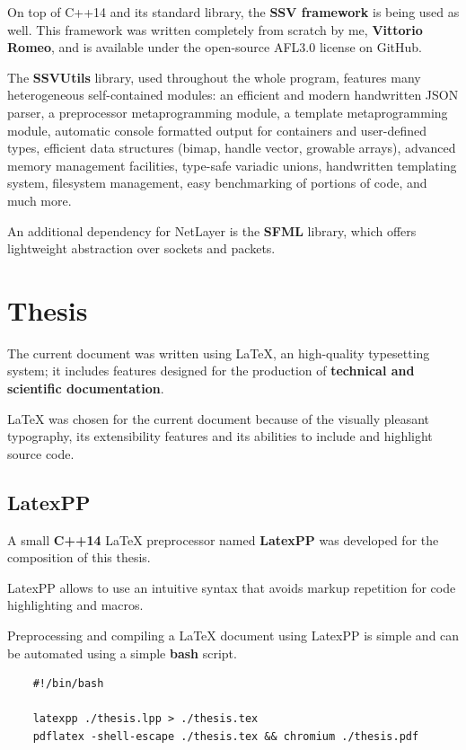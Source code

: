 \documentclass[11pt]{report}
\newcommand{\+}{\discretionary{\mbox{\scriptsize$\hookleftarrow$}}{}{}}
\renewcommand\emph{\textbf}
\begin{document}
                On top of C++14 and its standard library, the \emph{SSV framework} is being used as well. This framework was written completely from scratch by me, \emph{Vittorio Romeo}, and is available under the open-source AFL3.0 license on GitHub.

                The \emph{SSVUtils} library, used throughout the whole program, features many heterogeneous self-contained modules: an efficient and modern handwritten JSON parser, a preprocessor metaprogramming module, a template metaprogramming module, automatic console formatted output for containers and user-defined types, efficient data structures (bimap, handle vector, growable arrays), advanced memory management facilities, type-safe variadic unions, handwritten templating system, filesystem management, easy benchmarking of portions of code, and much more.

                An additional dependency for NetLayer is the \emph{SFML} library, which offers lightweight abstraction over sockets and packets.

            \section{Thesis}
                The current document was written using \LaTeX{}, an high-quality typesetting system; it includes features designed for the production of \emph{technical and scientific documentation}.

                \LaTeX{} was chosen for the current document because of the visually pleasant typography, its extensibility features and its abilities to include and highlight source code.

                \subsection{LatexPP}
                    A small \emph{C++14} \LaTeX{} preprocessor named \emph{LatexPP} was developed for the composition of this thesis.

                    LatexPP allows to use an intuitive syntax that avoids markup repetition for code highlighting and macros.

                    Preprocessing and compiling a \LaTeX{} document using LatexPP is simple and can be automated using a simple \emph{bash} script.


\begin{verbatim}
    #!/bin/bash

    latexpp ./thesis.lpp > ./thesis.tex
    pdflatex -shell-escape ./thesis.tex && chromium ./thesis.pdf
\end{verbatim}
\end{document}
